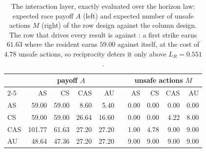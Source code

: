 \begin{table}[t]
\centering
\caption{The interaction layer, exactly evaluated over the horizon
law: expected race payoff $A$ (left) and expected number of unsafe
actions $M$ (right) of the row design against the column design.
The row that drives every result is \CAS{} against \CS{}: a first
strike earns $61.63$ where the resident earns $59.00$ against itself, at the cost of $4.78$ unsafe actions, so reciprocity deters it
only above $L_R = 0.551$.}
\label{tab:race}
\small
\begin{tabular}{lrrrrcrrrr}
\toprule
 & \multicolumn{4}{c}{payoff $A$} & & \multicolumn{4}{c}{unsafe actions $M$} \\
\cmidrule{2-5}\cmidrule{7-10}
 & AS & CS & CAS & AU & & AS & CS & CAS & AU \\
\midrule
AS & 59.00 & 59.00 & 8.60 & 5.40 & & 0.00 & 0.00 & 0.00 & 0.00 \\
CS & 59.00 & 59.00 & 26.64 & 16.60 & & 0.00 & 0.00 & 4.22 & 8.00 \\
CAS & 101.77 & 61.63 & 27.20 & 27.20 & & 1.00 & 4.78 & 9.00 & 9.00 \\
AU & 48.64 & 47.36 & 27.20 & 27.20 & & 9.00 & 9.00 & 9.00 & 9.00 \\
\bottomrule
\end{tabular}
\end{table}
